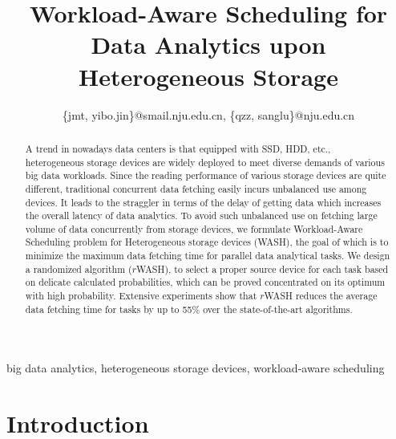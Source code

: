 \documentclass[conference]{IEEEtran}
\begin{document}
\title{Workload-Aware Scheduling for Data Analytics upon Heterogeneous Storage}

\author{
\{jmt, yibo.jin\}@smail.nju.edu.cn, \{qzz, sanglu\}@nju.edu.cn}


\maketitle
\begin{abstract}
A trend in nowadays data centers is that equipped with SSD, HDD, etc., heterogeneous storage devices are widely deployed to meet diverse demands of various big data workloads. 
Since the reading performance of various storage devices are quite different, traditional concurrent data fetching easily incurs unbalanced use among devices.
It leads to the straggler in terms of the delay of getting data which increases the overall latency of data analytics.
To avoid such unbalanced use on fetching large volume of data concurrently from storage devices, we formulate Workload-Aware Scheduling problem for Heterogeneous storage devices (WASH), the goal of which is to minimize the maximum data fetching time for parallel data analytical tasks. 
We design a randomized algorithm ($r$WASH), to select a proper source device for each task based on delicate calculated probabilities, which can be proved concentrated on its optimum with high probability. 
Extensive experiments show that $r$WASH reduces the average data fetching time for tasks by up to 55\% over the state-of-the-art algorithms.

\end{abstract}

\begin{IEEEkeywords} 
big data analytics, heterogeneous storage devices, workload-aware scheduling
\end{IEEEkeywords}

\section{Introduction}
\end{document}
